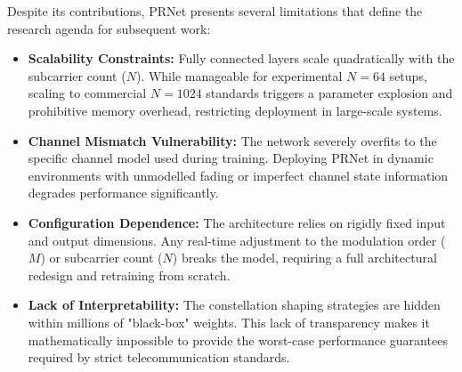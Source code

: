 Despite its contributions, PRNet presents several limitations that define the research agenda for subsequent work:
\begin{itemize}
    \item \textbf{Scalability Constraints:} Fully connected layers scale quadratically with the subcarrier count ($N$). While manageable for experimental $N=64$ setups, scaling to commercial $N=1024$ standards triggers a parameter explosion and prohibitive memory overhead, restricting deployment in large-scale systems.
    \item \textbf{Channel Mismatch Vulnerability:} The network severely overfits to the specific channel model used during training. Deploying PRNet in dynamic environments with unmodelled fading or imperfect channel state information degrades performance significantly.
    \item \textbf{Configuration Dependence:} The architecture relies on rigidly fixed input and output dimensions. Any real-time adjustment to the modulation order ($M$) or subcarrier count ($N$) breaks the model, requiring a full architectural redesign and retraining from scratch.
    \item \textbf{Lack of Interpretability:} The constellation shaping strategies are hidden within millions of "black-box" weights. This lack of transparency makes it mathematically impossible to provide the worst-case performance guarantees required by strict telecommunication standards.
\end{itemize}
